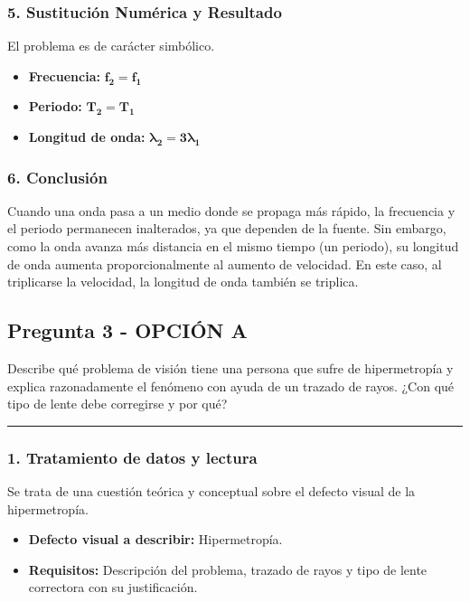 \subsubsection*{5. Sustitución Numérica y Resultado}
El problema es de carácter simbólico.
\begin{cajaresultado}
    \begin{itemize}
        \item \textbf{Frecuencia:} $\boldsymbol{f_2 = f_1}$
        \item \textbf{Periodo:} $\boldsymbol{T_2 = T_1}$
        \item \textbf{Longitud de onda:} $\boldsymbol{\lambda_2 = 3\lambda_1}$
    \end{itemize}
\end{cajaresultado}

\subsubsection*{6. Conclusión}
\begin{cajaconclusion}
Cuando una onda pasa a un medio donde se propaga más rápido, la frecuencia y el periodo permanecen inalterados, ya que dependen de la fuente. Sin embargo, como la onda avanza más distancia en el mismo tiempo (un periodo), su longitud de onda aumenta proporcionalmente al aumento de velocidad. En este caso, al triplicarse la velocidad, la longitud de onda también se triplica.
\end{cajaconclusion}

\newpage

\subsection{Pregunta 3 - OPCIÓN A}
\label{subsec:3A_2015_jun_ord}

\begin{cajaenunciado}
Describe qué problema de visión tiene una persona que sufre de hipermetropía y explica razonadamente el fenómeno con ayuda de un trazado de rayos. ¿Con qué tipo de lente debe corregirse y por qué?
\end{cajaenunciado}
\hrule

\subsubsection*{1. Tratamiento de datos y lectura}
Se trata de una cuestión teórica y conceptual sobre el defecto visual de la hipermetropía.
\begin{itemize}
    \item \textbf{Defecto visual a describir:} Hipermetropía.
    \item \textbf{Requisitos:} Descripción del problema, trazado de rayos y tipo de lente correctora con su justificación.
\end{itemize}

